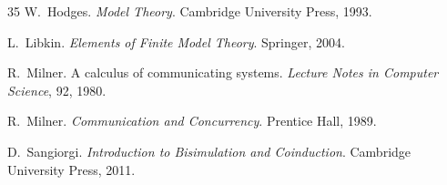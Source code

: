 \documentclass[pdflatex,sn-mathphys-num]{sn-jnl}
\theoremstyle{plain}
\theoremstyle{definition}
\theoremstyle{remark}
\begin{document}
\begin{thebibliography}{35}
W.~Hodges.
\newblock \emph{Model Theory}.
\newblock Cambridge University Press, 1993.

L.~Libkin.
\newblock \emph{Elements of Finite Model Theory}.
\newblock Springer, 2004.

R.~Milner.
\newblock A calculus of communicating systems.
\newblock \emph{Lecture Notes in Computer Science}, 92, 1980.

R.~Milner.
\newblock \emph{Communication and Concurrency}.
\newblock Prentice Hall, 1989.

D.~Sangiorgi.
\newblock \emph{Introduction to Bisimulation and Coinduction}.
\newblock Cambridge University Press, 2011.

\end{thebibliography}
\end{document}
